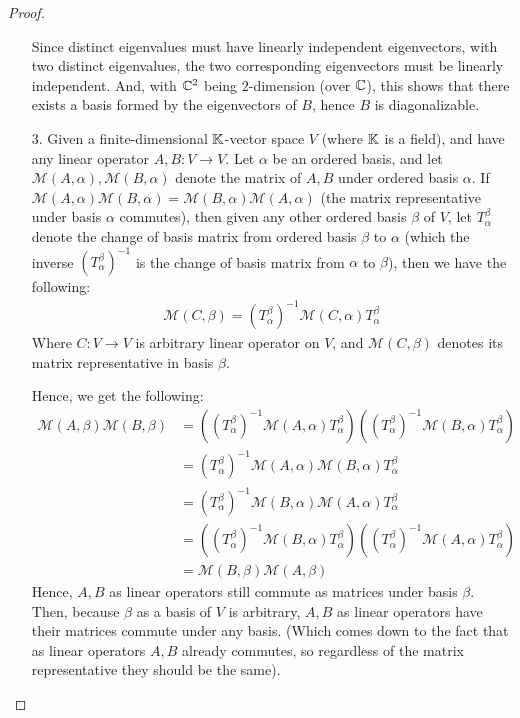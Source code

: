 \documentclass{article}
\begin{document}
\begin{proof}
\begin{itemize}
        Since distinct eigenvalues must have linearly independent eigenvectors, with two distinct eigenvalues, the two corresponding eigenvectors must be linearly independent. And, with $\CC^2$ being $2$-dimension (over $\CC$), this shows that there exists a basis formed by the eigenvectors of $B$, hence $B$ is diagonalizable.

        \hfil

        \item[3.] Given a finite-dimensional $\mathbb{K}$-vector space $V$ (where $\mathbb{K}$ is a field), and have any linear operator $A,B:V \rightarrow V$. Let $\alpha$ be an ordered basis, and let $\mathcal{M}(A, \alpha),\mathcal{M}(B,\alpha)$ denote the matrix of $A,B$ under ordered basis $\alpha$. If $\mathcal{M}(A,\alpha)\mathcal{M}(B,\alpha)=\mathcal{M}(B,\alpha)\mathcal{M}(A,\alpha)$ (the matrix representative under basis $\alpha$ commutes), then given any other ordered basis $\beta$ of $V$, let $T^\beta_\alpha$ denote the change of basis matrix from ordered basis $\beta$ to $\alpha$ (which the inverse $(T^\beta_\alpha)^{-1}$ is the change of basis matrix from $\alpha$ to $\beta$), then we have the following:
        \begin{align}
            \mathcal{M}(C,\beta) = (T^\beta_\alpha)^{-1}\mathcal{M}(C,\alpha)T^\beta_\alpha
        \end{align}
        Where $C:V\rightarrow V$ is arbitrary linear operator on $V$, and $\mathcal{M}(C,\beta)$ denotes its matrix representative in basis $\beta$.

        Hence, we get the following:
        \begin{align}
            \mathcal{M}(A,\beta)\mathcal{M}(B,\beta) &= \left((T^\beta_\alpha)^{-1}\mathcal{M}(A,\alpha)T^\beta_\alpha\right)\left((T^\beta_\alpha)^{-1}\mathcal{M}(B,\alpha)T^\beta_\alpha\right)\\ 
            &= (T^\beta_\alpha)^{-1}\mathcal{M}(A,\alpha)\mathcal{M}(B,\alpha)T^\beta_\alpha\\
            &= (T^\beta_\alpha)^{-1}\mathcal{M}(B,\alpha)\mathcal{M}(A,\alpha)T^\beta_\alpha\\
            &= \left((T^\beta_\alpha)^{-1}\mathcal{M}(B,\alpha)T^\beta_\alpha\right)\left((T^\beta_\alpha)^{-1}\mathcal{M}(A,\alpha)T^\beta_\alpha\right)\\
            &= \mathcal{M}(B,\beta)\mathcal{M}(A,\beta)
        \end{align}
        Hence, $A,B$ as linear operators still commute as matrices under basis $\beta$. Then, because $\beta$ as a basis of $V$ is arbitrary, $A,B$ as linear operators have their matrices commute under any basis. (Which comes down to the fact that as linear operators $A,B$ already commutes, so regardless of the matrix representative they should be the same).
    \end{itemize}
\end{proof}
\end{document}
